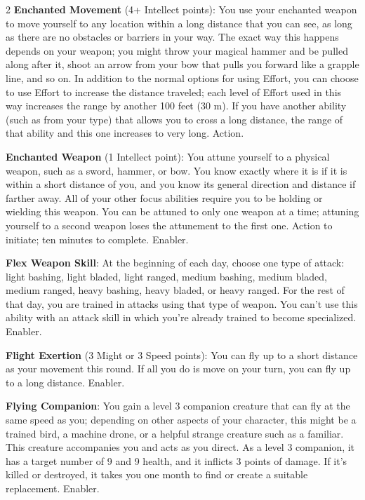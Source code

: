 \begin{multicols}{2}
\textbf{Enchanted Movement} (4+ Intellect points): You use your enchanted weapon to move yourself to any location within a long distance that you can see, as long as there are no obstacles or barriers in your way. The exact way this happens depends on your weapon; you might throw your magical hammer and be pulled along after it, shoot an arrow from your bow that pulls you forward like a grapple line, and so on. In addition to the normal options for using Effort, you can choose to use Effort to increase the distance traveled; each level of Effort used in this way increases the range by another 100 feet (30 m). If you have another ability (such as from your type) that allows you to cross a long distance, the range of that ability and this one increases to very long. Action.

\textbf{Enchanted Weapon} (1 Intellect point): You attune yourself to a physical weapon, such as a sword, hammer, or bow. You know exactly where it is if it is within a short distance of you, and you know its general direction and distance if farther away. All of your other focus abilities require you to be holding or wielding this weapon. You can be attuned to only one weapon at a time; attuning yourself to a second weapon loses the attunement to the first one. Action to initiate; ten minutes to complete. Enabler.

\textbf{Flex Weapon Skill}: At the beginning of each day, choose one type of attack: light bashing, light bladed, light ranged, medium bashing, medium bladed, medium ranged, heavy bashing, heavy bladed, or heavy ranged. For the rest of that day, you are trained in attacks using that type of weapon. You can’t use this ability with an attack skill in which you’re already trained to become specialized. Enabler.

\textbf{Flight Exertion} (3 Might or 3 Speed points): You can fly up to a short distance as your movement this round. If all you do is move on your turn, you can fly up to a long distance. Enabler.

\textbf{Flying Companion}: You gain a level 3 companion creature that can fly at the same speed as you; depending on other aspects of your character, this might be a trained bird, a machine drone, or a helpful strange creature such as a familiar. This creature accompanies you and acts as you direct. As a level 3 companion, it has a target number of 9 and 9 health, and it inflicts 3 points of damage. If it’s killed or destroyed, it takes you one month to find or create a suitable replacement. Enabler. 


\end{multicols}
